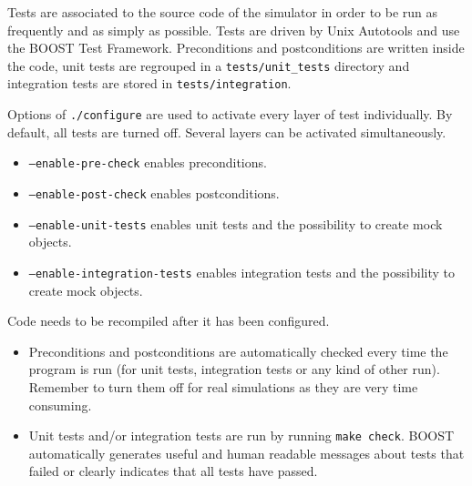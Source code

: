 Tests are associated to the source code of the simulator in order to be run
as frequently and as simply as possible.
Tests are driven by Unix Autotools and use the BOOST Test Framework.
Preconditions and postconditions are written inside the code,
unit tests are regrouped in a \texttt{tests/unit\_tests} directory
and integration tests are stored in \texttt{tests/integration}.

Options of \texttt{./configure} are used to activate every layer of test individually.
By default, all tests are turned off.
Several layers can be activated simultaneously.
\begin{itemize}
  \item \texttt{--enable-pre-check} enables preconditions.
  \item \texttt{--enable-post-check} enables postconditions.
  \item \texttt{--enable-unit-tests} enables unit tests and the possibility to create mock objects.
  \item \texttt{--enable-integration-tests} enables integration tests and the possibility to create mock objects.
\end{itemize}

Code needs to be recompiled after it has been configured.
\begin{itemize}
  \item Preconditions and postconditions are automatically checked every time the program is run
  (for unit tests, integration tests or any kind of other run).
  Remember to turn them off for real simulations as they are very time consuming.
  \item Unit tests and/or integration tests are run by running \texttt{make check}.
  BOOST automatically generates useful and human readable messages
  about tests that failed or clearly indicates that all tests have passed.
\end{itemize}
